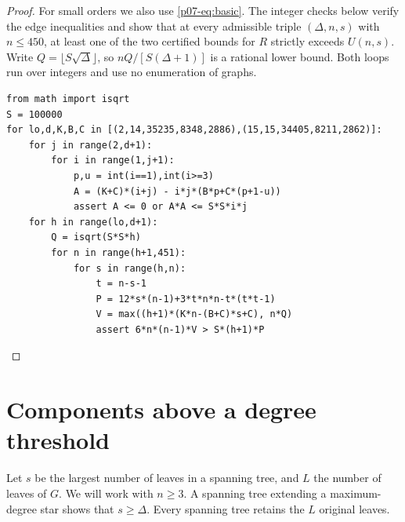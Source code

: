 \documentclass[11pt,a4paper]{article}
\begin{document}
\begin{proof}
For small orders we also use \eqref{p07-eq:basic}. The integer checks below
verify the edge inequalities and show that at every admissible triple
$(\Delta,n,s)$ with $n\le450$, at least one of the two certified bounds
for $R$ strictly exceeds $U(n,s)$. Write $Q=\lfloor S\sqrt{\Delta}\rfloor$,
so $nQ/[S(\Delta+1)]$ is a rational lower bound. Both loops run over
integers and use no enumeration of graphs.
{\small
\begin{verbatim}
from math import isqrt
S = 100000
for lo,d,K,B,C in [(2,14,35235,8348,2886),(15,15,34405,8211,2862)]:
    for j in range(2,d+1):
        for i in range(1,j+1):
            p,u = int(i==1),int(i>=3)
            A = (K+C)*(i+j) - i*j*(B*p+C*(p+1-u))
            assert A <= 0 or A*A <= S*S*i*j
    for h in range(lo,d+1):
        Q = isqrt(S*S*h)
        for n in range(h+1,451):
            for s in range(h,n):
                t = n-s-1
                P = 12*s*(n-1)+3*t*n*n-t*(t*t-1)
                V = max((h+1)*(K*n-(B+C)*s+C), n*Q)
                assert 6*n*(n-1)*V > S*(h+1)*P
\end{verbatim}
}
\end{proof}

\section{Components above a degree threshold}\label{p07-sec:hubs}
Let $s$ be the largest number of leaves in a spanning tree, and $L$ the number of leaves of $G$. We will work with $n\ge3$. A spanning tree extending a maximum-degree star shows that $s\ge\Delta$. Every spanning tree retains the $L$ original leaves.
\end{document}
